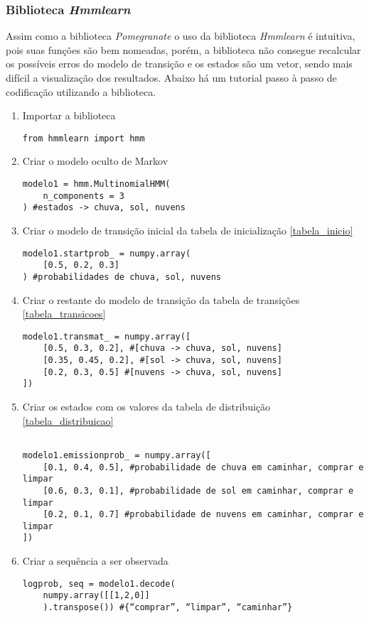 \documentclass{article}
\begin{document}
\subsubsection{Biblioteca \emph{Hmmlearn}}
Assim como a biblioteca \emph{Pomegranate} o uso da biblioteca \emph{Hmmlearn} é intuitiva, pois suas funções são bem nomeadas, porém, a biblioteca não consegue recalcular os possíveis erros do modelo de transição e os estados são um vetor, sendo mais difícil a visualização dos resultados. Abaixo há um  tutorial passo à passo de codificação utilizando a biblioteca.
\begin{enumerate}
\label{lista_hmmlearn}
\item Importar a biblioteca
\begin{verbatim}
from hmmlearn import hmm
\end{verbatim}
    
\item Criar o modelo oculto de Markov
\begin{verbatim}
modelo1 = hmm.MultinomialHMM(
    n_components = 3
) #estados -> chuva, sol, nuvens
\end{verbatim}

\item Criar o modelo de transição inicial da tabela de inicialização \ref{tabela_inicio}
\begin{verbatim}
modelo1.startprob_ = numpy.array(
    [0.5, 0.2, 0.3]
) #probabilidades de chuva, sol, nuvens
\end{verbatim}

\item Criar o restante do modelo de transição da tabela de transições \ref{tabela_transicoes}
\begin{verbatim}
modelo1.transmat_ = numpy.array([
    [0.5, 0.3, 0.2], #[chuva -> chuva, sol, nuvens]    
    [0.35, 0.45, 0.2], #[sol -> chuva, sol, nuvens] 
    [0.2, 0.3, 0.5] #[nuvens -> chuva, sol, nuvens] 
])
\end{verbatim}

\item Criar os estados com os valores da tabela de distribuição \ref{tabela_distribuicao}
\begin{verbatim}

modelo1.emissionprob_ = numpy.array([
    [0.1, 0.4, 0.5], #probabilidade de chuva em caminhar, comprar e limpar
    [0.6, 0.3, 0.1], #probabilidade de sol em caminhar, comprar e limpar
    [0.2, 0.1, 0.7] #probabilidade de nuvens em caminhar, comprar e limpar
])   
\end{verbatim}

\item Criar a sequência a ser observada
\begin{verbatim}
logprob, seq = modelo1.decode(
    numpy.array([[1,2,0]]
    ).transpose()) #{“comprar”, “limpar”, “caminhar”}

\end{verbatim}

\end{enumerate}
 
\end{document}
